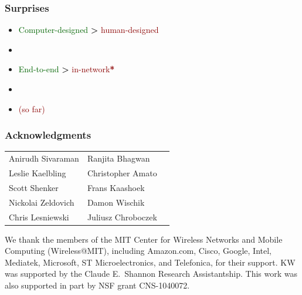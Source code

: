 \documentclass[svgnames]{beamer}
\newcommand{\ssline}{\vspace{8 pt}}
\begin{document}
\begin{frame}
\frametitle{Surprises}

\LARGE

\begin{itemize}

\item \textcolor{DarkGreen}{Computer-designed} {\LARGE \textbf{\textgreater}} \textcolor{DarkRed}{human-designed}

\item[]

\item \textcolor{DarkGreen}{End-to-end} {\LARGE \textbf{\textgreater}} \textcolor{DarkRed}{in-network{\LARGE \textbf{*}}}

\item[]

\item[] \hspace{6.0 cm}\normalsize\textcolor{DarkRed}{{\bf *} (so far)}

\end{itemize}

\end{frame}

\begin{frame}
\frametitle{Acknowledgments}

\begin{centering}
\begin{tabular}{lll}
Anirudh Sivaraman & Ranjita Bhagwan \\
Leslie Kaelbling & Christopher Amato \\
Scott Shenker & Frans Kaashoek \\
Nickolai Zeldovich & Damon Wischik \\
Chris Lesniewski & Juliusz Chroboczek \\
\end{tabular}

\end{centering}

\ssline
\ssline

\footnotesize We thank the members of the MIT Center for Wireless
Networks and Mobile Computing (Wireless@MIT), including Amazon.com,
Cisco, Google, Intel, Mediatek, Microsoft, ST Microelectronics, and
Telefonica, for their support. KW was supported by the Claude
E.~Shannon Research Assistantship. This work was also supported in
part by NSF grant CNS-1040072.

\end{frame}
\end{document}
